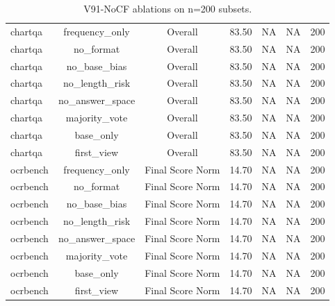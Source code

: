 \begin{table}[t]
\begin{tabular}{lcccccc}
chartqa & frequency_only & Overall & 83.50 & NA & NA & 200 \\
chartqa & no_format & Overall & 83.50 & NA & NA & 200 \\
chartqa & no_base_bias & Overall & 83.50 & NA & NA & 200 \\
chartqa & no_length_risk & Overall & 83.50 & NA & NA & 200 \\
chartqa & no_answer_space & Overall & 83.50 & NA & NA & 200 \\
chartqa & majority_vote & Overall & 83.50 & NA & NA & 200 \\
chartqa & base_only & Overall & 83.50 & NA & NA & 200 \\
chartqa & first_view & Overall & 83.50 & NA & NA & 200 \\
ocrbench & frequency_only & Final Score Norm & 14.70 & NA & NA & 200 \\
ocrbench & no_format & Final Score Norm & 14.70 & NA & NA & 200 \\
ocrbench & no_base_bias & Final Score Norm & 14.70 & NA & NA & 200 \\
ocrbench & no_length_risk & Final Score Norm & 14.70 & NA & NA & 200 \\
ocrbench & no_answer_space & Final Score Norm & 14.70 & NA & NA & 200 \\
ocrbench & majority_vote & Final Score Norm & 14.70 & NA & NA & 200 \\
ocrbench & base_only & Final Score Norm & 14.70 & NA & NA & 200 \\
ocrbench & first_view & Final Score Norm & 14.70 & NA & NA & 200 \\
\bottomrule
\end{tabular}
\caption{V91-NoCF ablations on n=200 subsets.}
\label{tab:nocf_ablation_n200}
\end{table}
